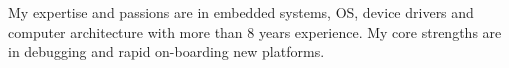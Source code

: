 My expertise and passions are in embedded systems, OS, device drivers and computer architecture with more than 8 years experience. My core strengths are in debugging and rapid on-boarding new platforms.
